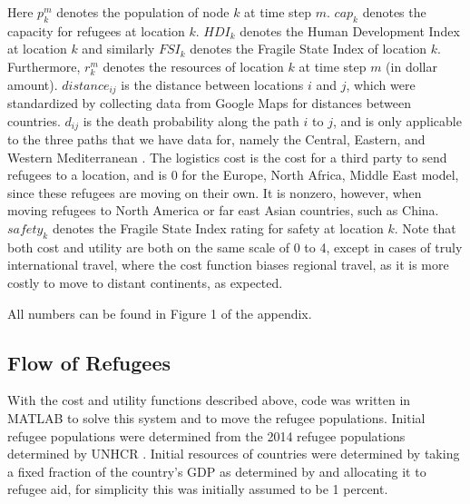 \documentclass{article}
\begin{document}
Here $p_k^m$ denotes the population of node $k$ at time step $m$. $cap_k$ denotes the capacity for refugees at location $k$. $HDI_k$ denotes the Human Development Index at location $k$ and similarly $FSI_k$ denotes the Fragile State Index of location $k$. Furthermore, $r_k^m$ denotes the resources of location $k$ at time step $m$ (in dollar amount). $distance_{ij}$ is the distance between locations $i$ and $j$, which were standardized by collecting data from Google Maps for distances between countries. $d_{ij}$ is the death probability along the path $i$ to $j$, and is only applicable to the three paths that we have data for, namely the Central, Eastern, and Western Mediterranean \cite{BBCMigrationGraphics}. The logistics cost is the cost for a third party to send refugees to a location, and is $0$ for the Europe, North Africa, Middle East model, since these refugees are moving on their own. It is nonzero, however, when moving refugees to North America or far east Asian countries, such as China. $safety_k$ denotes the Fragile State Index rating for safety at location $k$.
Note that both cost and utility are both on the same scale of 0 to 4, except in cases of truly international travel, where the cost function biases regional travel, as it is more costly to move to distant continents, as expected.

All numbers can be found in Figure 1 of the appendix.

\subsection{Flow of Refugees}

With the cost and utility functions described above, code was written in MATLAB to solve this system and to move the refugee populations. Initial refugee populations were determined from the 2014 refugee populations determined by UNHCR \cite{Rdata}. Initial resources of countries were determined by taking a fixed fraction of the country's GDP as determined by \cite{GDP} and allocating it to refugee aid, for simplicity this was initially assumed to be 1 percent.
\end{document}
